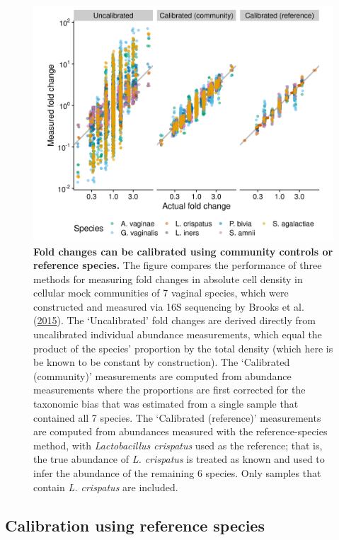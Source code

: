 \documentclass[
]{article}
\begin{document}
\begin{figure}
\includegraphics[width=1\linewidth]{notebook/_posts/2021-10-25-brooks2015thet-calibration/brooks2015thet-calibration_files/figure-html5/brooks2015thet_fc_calibration-1} \caption{\textbf{Fold changes can be calibrated using community controls or reference species.} The figure compares the performance of three methods for measuring fold changes in absolute cell density in cellular mock communities of 7 vaginal species, which were constructed and measured via 16S sequencing by Brooks et al. (\protect\hyperlink{ref-brooks2015thet}{2015}). The `Uncalibrated' fold changes are derived directly from uncalibrated individual abundance measurements, which equal the product of the species' proportion by the total density (which here is be known to be constant by construction). The `Calibrated (community)' measurements are computed from abundance measurements where the proportions are first corrected for the taxonomic bias that was estimated from a single sample that contained all 7 species. The `Calibrated (reference)' measurements are computed from abundances measured with the reference-species method, with \emph{Lactobacillus crispatus} used as the reference; that is, the true abundance of \emph{L. crispatus} is treated as known and used to infer the abundance of the remaining 6 species. Only samples that contain \emph{L. crispatus} are included.}\label{fig:calibration-example}
\end{figure}



\hypertarget{calibration-using-reference-species}{%
\subsection{Calibration using reference species}\label{calibration-using-reference-species}}
\end{document}
